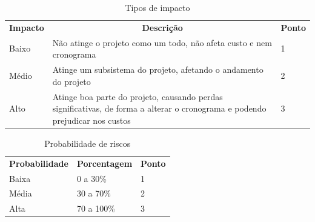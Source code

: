 \begin{table}[h]
 \centering
 {\renewcommand\arraystretch{1.25}
 \caption{Tipos de impacto}\label{tab:impacto}
 \begin{tabular}{ l l l }
  \cline{1-1}\cline{2-2}\cline{3-3}  
    \multicolumn{1}{|c|}{\textbf{Impacto} \centering } &
    \multicolumn{1}{c|}{\textbf{Descrição} \centering } &
    \multicolumn{1}{c|}{\textbf{Ponto} \centering }
  \\  
  \cline{1-1}\cline{2-2}\cline{3-3}  
    \multicolumn{1}{|p{3.850cm}|}{Baixo \centering } &
    \multicolumn{1}{p{4.217cm}|}{Não atinge o projeto como um todo, não afeta custo e nem cronograma \centering } &
    \multicolumn{1}{p{4.217cm}|}{1 \centering }
  \\  
  \cline{1-1}\cline{2-2}\cline{3-3}  
    \multicolumn{1}{|p{3.850cm}|}{Médio \centering } &
    \multicolumn{1}{p{4.217cm}|}{Atinge um subsistema do projeto, afetando o andamento do projeto \centering } &
    \multicolumn{1}{p{4.217cm}|}{2 \centering }
  \\  
  \cline{1-1}\cline{2-2}\cline{3-3}  
    \multicolumn{1}{|p{3.850cm}|}{Alto \centering } &
    \multicolumn{1}{p{4.217cm}|}{Atinge boa parte do projeto, causando perdas significativas, de forma a alterar o cronograma e podendo prejudicar nos custos \centering } &
    \multicolumn{1}{p{4.217cm}|}{3 \centering }
  \\  
  \hline

 \end{tabular} }
\end{table}


\begin{table}[h]
 \centering
 {\renewcommand\arraystretch{1.25}
 \caption{Probabilidade de riscos} \label{tab:probabilidade}
 \begin{tabular}{ l l l }
  \cline{1-1}\cline{2-2}\cline{3-3}  
    \multicolumn{1}{|c|}{\textbf{Probabilidade} \centering } &
    \multicolumn{1}{c|}{\textbf{Porcentagem} \centering } &
    \multicolumn{1}{c|}{\textbf{Ponto} \centering }
  \\  
  \cline{1-1}\cline{2-2}\cline{3-3}  
    \multicolumn{1}{|p{3.850cm}|}{Baixa \centering } &
    \multicolumn{1}{p{4.217cm}|}{0 a 30\% \centering } &
    \multicolumn{1}{p{4.217cm}|}{1 \centering }
  \\  
  \cline{1-1}\cline{2-2}\cline{3-3}  
    \multicolumn{1}{|p{3.850cm}|}{Média \centering } &
    \multicolumn{1}{p{4.217cm}|}{30 a 70\% \centering } &
    \multicolumn{1}{p{4.217cm}|}{2 \centering }
  \\  
  \cline{1-1}\cline{2-2}\cline{3-3}  
    \multicolumn{1}{|p{3.850cm}|}{Alta \centering } &
    \multicolumn{1}{p{4.217cm}|}{70 a 100\% \centering } &
    \multicolumn{1}{p{4.217cm}|}{3 \centering }
  \\  
  \hline

 \end{tabular} }
\end{table}


